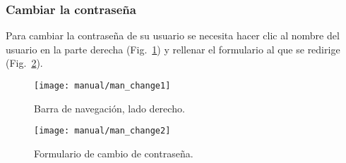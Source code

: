 \subsubsection{Cambiar la contraseña}
Para cambiar la contraseña de su usuario se necesita hacer clic al nombre del usuario en la parte derecha (Fig.~\ref{fig:man_username}) y rellenar el formulario al que se  redirige (Fig.~\ref{fig:man_changepass}).

\begin{figure}
	\centering
	\texttt{[image: manual/man\_change1]}
	\caption{Barra de navegación, lado derecho.}
	\label{fig:man_username}
\end{figure}

\begin{figure}
	\centering
	\texttt{[image: manual/man\_change2]}
	\caption{Formulario de cambio de contraseña.}
	\label{fig:man_changepass}
\end{figure}
